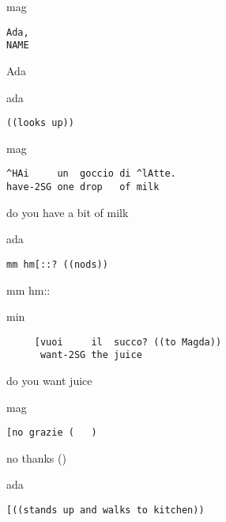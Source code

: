 \documentclass[output=paper,modfonts]{langscibook}
\begin{document}
\vspace{2mm}
%
\begin{transbox}{1}{mag}
\begin{verbatim}
Ada,
NAME
\end{verbatim}
Ada
\end{transbox}\vspace{2mm}
%
\begin{transbox}{2}{ada}
\begin{verbatim}
((looks up))
\end{verbatim}
\end{transbox}
%
\begin{mdframednoverticalspace}[style=firstfoc]
\begin{transbox}{3}{mag}
\begin{verbatim}
^HAi     un  goccio di ^lAtte.
have-2SG one drop   of milk
\end{verbatim}
do you have a bit of milk
\end{transbox}
\end{mdframednoverticalspace}\vspace{1.5mm}
%
\vspace{-0.5mm}
%
\begin{mdframednoverticalspace}[style=secondfoc]
\begin{transbox}{5}{ada}
\begin{verbatim}
mm hm[::? ((nods))
\end{verbatim}
mm hm::
\end{transbox}
\end{mdframednoverticalspace}\vspace{2mm}
%
\begin{transbox}{6}{min}
\begin{verbatim}
     [vuoi     il  succo? ((to Magda))
      want-2SG the juice
\end{verbatim}
\hspace{0.8cm} do you want juice
\end{transbox}\vspace{0.75mm}
%
\vspace{-0.5mm}
%
\begin{transbox}{8}{mag}
\begin{verbatim}
[no grazie (   )
\end{verbatim}
\hspace{0.07cm} no thanks (\hspace{0.5cm})
\end{transbox}
%
\begin{mdframednoverticalspace}[style=secondfoc]
\begin{transbox}{9}{ada}
\begin{verbatim}
[((stands up and walks to kitchen))
\end{verbatim}
\end{transbox}
\end{mdframednoverticalspace}
\end{document}

